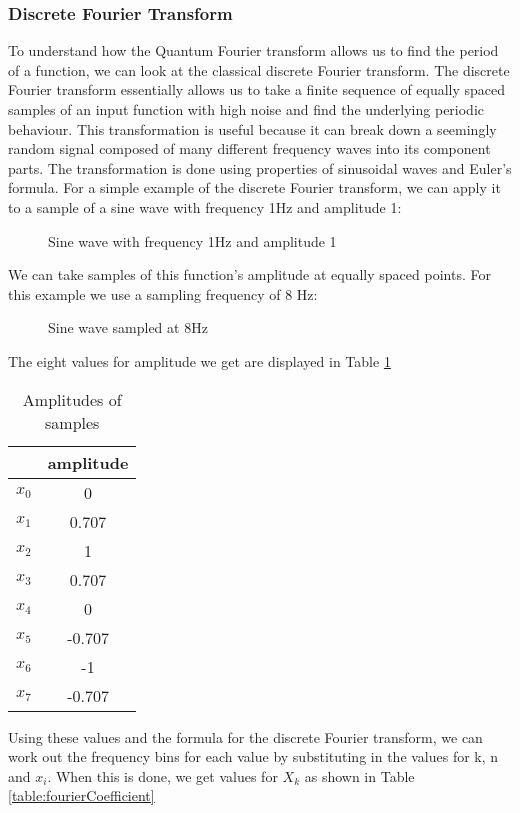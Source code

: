 \subsubsection{Discrete Fourier Transform} 
To understand how the Quantum Fourier transform allows us to find the period of a function, we can look at the classical discrete Fourier transform. The discrete Fourier transform essentially allows us to take a finite sequence of equally spaced samples of an input function with high noise and find the underlying periodic behaviour. This transformation is useful because it can break down a seemingly random signal composed of many different frequency waves into its component parts. The transformation is done using properties of sinusoidal waves and Euler's formula.
For a simple example of the discrete Fourier transform, we can apply it to a sample of a sine wave with frequency 1Hz and amplitude 1:
\begin{figure}[!htb]
\centering
\resizebox{7cm}{!}{}
\caption{Sine wave with frequency 1Hz and amplitude 1}
\label{fig:sine}
\end{figure}
We can take samples of this function's amplitude at equally spaced points. For this example we use a sampling frequency of 8 Hz:
\begin{figure}[!htb]
\centering
\resizebox{7cm}{!}{}
\caption{Sine wave sampled at 8Hz}
\label{fig:sineSample}
\end{figure}
The eight values for amplitude we get are displayed in Table \ref{table:amplitudes}
\begin{table}[!htb]
\centering
\begin{tabular}{ |c|c| } 
\hline
 & amplitude \\
\hline
$x_0$ & 0 \\ 
$x_1$ & 0.707 \\ 
$x_2$ & 1 \\ 
$x_3$ & 0.707 \\ 
$x_4$ & 0 \\ 
$x_5$ & -0.707 \\ 
$x_6$ & -1 \\ 
$x_7$ & -0.707 \\ 
\hline
\end{tabular}
\caption{Amplitudes of samples}
\label{table:amplitudes}
\end{table}
Using these values and the formula for the discrete Fourier transform, we can work out the frequency bins for each value by substituting in the values for k, n and $x_i$. When this is done, we get values for $X_k$ as shown in Table \ref{table:fourierCoefficient}
